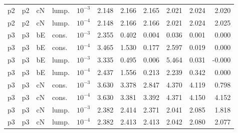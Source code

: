 \begin{longtable}{llllllllrrr}
p2 & p2 & cN & lump. & $10^{-3}$ & 2.148 & 2.166 & 2.165 & 2.021 & 2.024 & 2.020 \\
p2 & p2 & cN & lump. & $10^{-4}$ & 2.148 & 2.166 & 2.166 & 2.021 & 2.024 & 2.025 \\
p3 & p3 & bE & cons. & $10^{-3}$ & 2.355 & 0.402 & 0.004 & 0.036 & 0.001 & 0.000 \\
p3 & p3 & bE & cons. & $10^{-4}$ & 3.465 & 1.530 & 0.177 & 2.597 & 0.019 & 0.000 \\
p3 & p3 & bE & lump. & $10^{-3}$ & 3.335 & 0.495 & 0.006 & 5.464 & 0.031 & -0.000 \\
p3 & p3 & bE & lump. & $10^{-4}$ & 2.437 & 1.556 & 0.213 & 2.239 & 0.342 & 0.000 \\
p3 & p3 & cN & cons. & $10^{-3}$ & 3.630 & 3.378 & 2.847 & 4.370 & 4.119 & 0.798 \\
p3 & p3 & cN & cons. & $10^{-4}$ & 3.630 & 3.381 & 3.392 & 4.371 & 4.150 & 4.152 \\
p3 & p3 & cN & lump. & $10^{-3}$ & 2.382 & 2.414 & 2.371 & 2.041 & 2.085 & 1.818 \\
p3 & p3 & cN & lump. & $10^{-4}$ & 2.382 & 2.413 & 2.413 & 2.042 & 2.080 & 2.077 \\
\bottomrule
\end{longtable}
\normalsize
